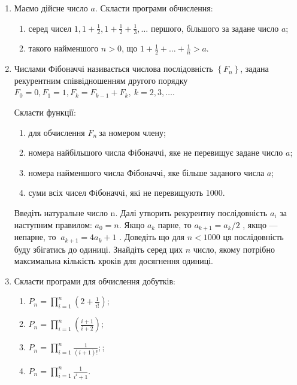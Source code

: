 \documentclass[]{article}
\makeatletter
\newcommand{\xslalph}[1]{\expandafter\@xslalph\csname c@#1\endcsname}
\newcommand{\@xslalph}[1]{%
    \ifcase#1\or а\or б\or в\or г\or д\or e\or є\or ж\or з\or i%
    \or й\or к\or л\or м\or н\or о\or п\or р\or с\or т%
    \or у\or ф\or х\or ц\or ч\or ш\or ю\or я\or аа\or бб\or вв %
    \else\@ctrerr\fi%
}
\makeatother
\begin{document}
\begin{enumerate}
\def\labelenumi{\arabic{enumi})}
\item
  Маємо дійсне число $a$. Скласти програми обчислення:
\begin{enumerate}[label=\xslalph*)]
\item серед чисел
\(1,1 + \frac{1}{2},1 + \frac{1}{2} + \frac{1}{3},\ldots\) першого,
більшого за задане число $a$;

\item такого найменшого $n>0$, що
\(1 + \frac{1}{2} + \ldots + \frac{1}{n} > a.\)

\end{enumerate}

\item
  Числами Фібоначчі називається числова послідовність
  \(\left\{ F_{n} \right\}\), задана рекурентним співвідношенням другого
  порядку
  \(F_{0} = 0,F_{1} = 1,F_{k} = F_{k - 1} + F_{k},\ k = 2,3,\ldots\).

Скласти функції:
\begin{enumerate}[label=\xslalph*)]
\item
для обчислення \(F_{n}\ \)за номером члену;
\item номера найбільшого числа Фібоначчі, яке не перевищує задане число
$a$;
\item номера найменшого числа Фібоначчі, яке більше заданого числа
$a$;
\item суми всіх чисел Фібоначчі, які не перевищують 1000.

\end{enumerate}
Введіть натуральне число n. Далі утворить рекурентну послідовність
\(a_{i}\) за наступним правилом: \(a_{0} = n\). Якщо \(a_{k}\) парне, то
\(a_{k + 1} = a_{k}/2\) , якщо --- непарне,
то \(\ a_{k + 1} = 4a_{k} + 1\) . Доведіть що для $n<1000$ ця
послідовність буду збігатись до одиниці. Знайдіть серед цих $n$ число,
якому потрібно максимальна кількість кроків для досягнення одиниці.

\item
  Скласти програми для обчислення добутків:
\begin{enumerate}[label=\xslalph*)]
\item \(P_{n} = \prod\limits_{i = 1}^{n}\left( 2 + \frac{1}{i!} \right);\) 
\item
\(P_{n} = \prod\limits_{i = 1}^{n}\left( \frac{i + 1}{i + 2} \right);\)
\item
\(P_{n} = \prod\limits_{i = 1}^{n}\frac{1}{(i + 1)!};\); 
\item
\(P_{n} = \prod\limits_{i = 1}^{n}\frac{1}{i^{i} + 1}.\)
\end{enumerate}


\end{enumerate}
\end{document}
